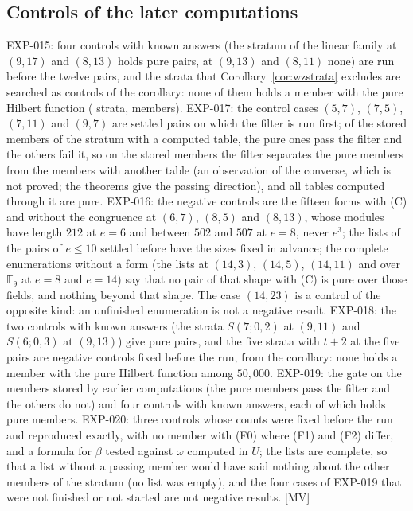 \documentclass[11pt]{article}
\theoremstyle{definition}
\theoremstyle{remark}
\newcommand{\EXP}[1]{\mbox{EXP-#1}}
\newcommand{\F}{\mathbb{F}}
\begin{document}
\subsection{Controls of the later computations}
\label{sec:ablation3}

\EXP{015}: four controls with known answers (the stratum of the linear family at $(9,17)$ and $(8,13)$ holds pure pairs, at $(9,13)$ and $(8,11)$ none) are run before the twelve pairs, and the strata that Corollary~\ref{cor:wzstrata} excludes are searched as controls of the corollary: none of them holds a member with the pure Hilbert function (\nwzExcludedFifteen{} strata, \nwzExcludedFifteenMembers{} members). \EXP{017}: the control cases $(5,7)$, $(7,5)$, $(7,11)$ and $(9,7)$ are settled pairs on which the filter is run first; of the stored members of the stratum with a computed table, the \nstmPure{} pure ones pass the filter and the \nstmOther{} others fail it, so on the stored members the filter separates the pure members from the members with another table (an observation of the converse, which is not proved; the theorems give the passing direction), and all \nfltTables{} tables computed through it are pure. \EXP{016}: the negative controls are the fifteen forms with (C) and without the congruence at $(6,7)$, $(8,5)$ and $(8,13)$, whose modules have length $212$ at $e=6$ and between $502$ and $507$ at $e=8$, never $e^3$; the lists of the pairs of $e\le10$ settled before have the sizes fixed in advance; the complete enumerations without a form (the lists at $(14,3)$, $(14,5)$, $(14,11)$ and over $\F_9$ at $e=8$ and $e=14$) say that no pair of that shape with (C) is pure over those fields, and nothing beyond that shape. The case $(14,23)$ is a control of the opposite kind: an unfinished enumeration is not a negative result. \EXP{018}: the two controls with known answers (the strata $S(7;0,2)$ at $(9,11)$ and $S(6;0,3)$ at $(9,13)$) give pure pairs, and the five strata with $t+2$ at the five pairs are negative controls fixed before the run, from the corollary: none holds a member with the pure Hilbert function among $50{,}000$. \EXP{019}: the gate on the members stored by earlier computations (the \nevtStoredPure{} pure members pass the filter and the \nevtStoredOther{} others do not) and four controls with known answers, each of which holds pure members. \EXP{020}: three controls whose counts were fixed before the run and reproduced exactly, with no member with (F0) where (F1) and (F2) differ, and a formula for $\beta$ tested against $\omega$ computed in $U$; the lists are complete, so that a list without a passing member would have said nothing about the other members of the stratum (no list was empty), and the four cases of \EXP{019} that were not finished or not started are not negative results. [MV]
\end{document}
